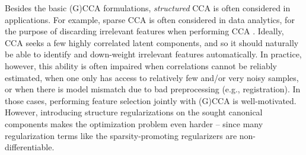 \documentclass[10pt,journal]{IEEEtran}
\begin{document}
Besides the basic (G)CCA formulations, \emph{structured} CCA \cite{hardoon2011sparse} is often considered in applications.
For example, sparse CCA is often considered in data analytics, for the purpose of discarding irrelevant features when performing CCA \cite{witten2009penalized,chen2012structured,witten2009extensions}.
Ideally, CCA seeks a few highly correlated latent components, and so it should naturally be able to identify and down-weight irrelevant features automatically. In practice, however, this ability is often impaired when correlations cannot be reliably estimated, when one only has access to relatively few and/or very noisy samples, or when there is model mismatch due to bad preprocessing (e.g., registration). In those cases, performing feature selection jointly with (G)CCA is well-motivated. However, introducing structure regularizations on the sought canonical components makes the optimization problem even harder -- since many regularization terms like the sparsity-promoting regularizers are non-differentiable.
\end{document}
